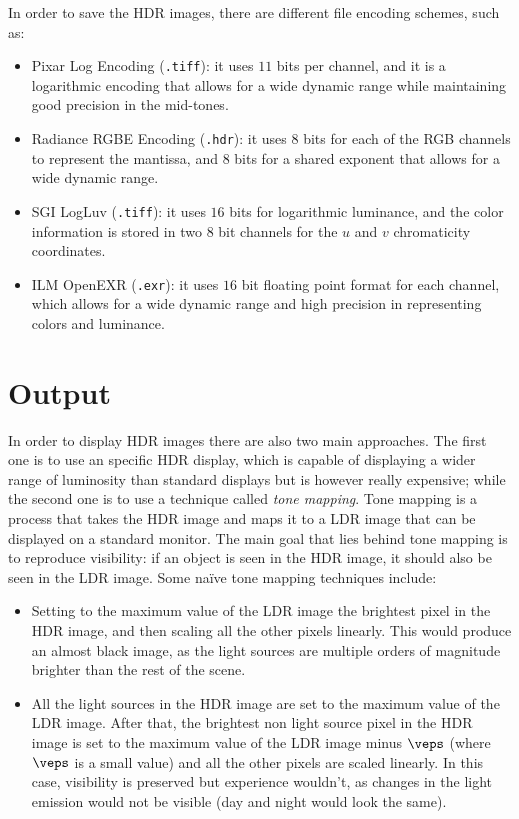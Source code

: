 In order to save the HDR images, there are different file encoding schemes, such as:
\begin{itemize}
    \item Pixar Log Encoding (\texttt{.tiff}): it uses $11$ bits per channel, and it is a logarithmic encoding that allows for a wide dynamic range while maintaining good precision in the mid-tones.
    \item Radiance RGBE Encoding (\texttt{.hdr}): it uses $8$ bits for each of the RGB channels to represent the mantissa, and $8$ bits for a shared exponent that allows for a wide dynamic range.
    \item SGI LogLuv (\texttt{.tiff}): it uses $16$ bits for logarithmic luminance, and the color information is stored in two $8$ bit channels for the $u$ and $v$ chromaticity coordinates.
    \item ILM OpenEXR (\texttt{.exr}): it uses $16$ bit floating point format for each channel, which allows for a wide dynamic range and high precision in representing colors and luminance.
\end{itemize}
\section{Output}

In order to display HDR images there are also two main approaches. The first one is to use an specific HDR display, which is capable of displaying a wider range of luminosity than standard displays but is however really expensive; while the second one is to use a technique called \emph{tone mapping}. Tone mapping is a process that takes the HDR image and maps it to a LDR image that can be displayed on a standard monitor. The main goal that lies behind tone mapping is to reproduce visibility: if an object is seen in the HDR image, it should also be seen in the LDR image. Some naïve tone mapping techniques include:
\begin{itemize}
    \item Setting to the maximum value of the LDR image the brightest pixel in the HDR image, and then scaling all the other pixels linearly. This would produce an almost black image, as the light sources are multiple orders of magnitude brighter than the rest of the scene.
    \item All the light sources in the HDR image are set to the maximum value of the LDR image. After that, the brightest non light source pixel in the HDR image is set to the maximum value of the LDR image minus $\veps$ (where $\veps$ is a small value) and all the other pixels are scaled linearly. In this case, visibility is preserved but experience wouldn't, as changes in the light emission would not be visible (day and night would look the same).
\end{itemize}


